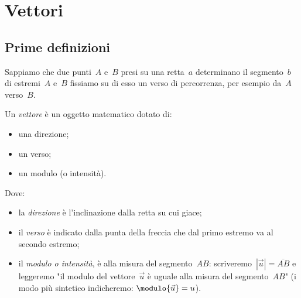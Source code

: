 


\chapter{Vettori}

\section{Prime definizioni}
\label{sec:vett_primedefinizioni}

% 

Sappiamo che due punti~$A$ e~$B$ presi su una retta~$a$ determinano il 
segmento~$b$ di estremi~$A$ e~$B$ fissiamo su di esso un verso di percorrenza, 
per esempio da~$A$ verso~$B$.

\begin{definizione}
Un \emph{vettore} è un oggetto matematico dotato di:

\begin{minipage}{.39 \textwidth}
\begin{itemize}
 \item una direzione;
 \item un verso;
 \item un modulo (o intensità).
\end{itemize}
\end{minipage}
\hfill
\begin{minipage}{.59 \textwidth}
 \begin{inaccessibleblock}
 \begin{center}
  \vettoredef
 \end{center}
\end{inaccessibleblock}
\end{minipage}
\end{definizione}

Dove:
\begin{itemize} [nosep]
\item la \emph{direzione} è l'inclinazione dalla retta su cui giace;
\item il \emph{verso} è indicato dalla punta della freccia che dal primo 
estremo va al secondo estremo;
\item il \emph{modulo o intensità}, è alla misura del segmento~$AB$: 
scriveremo~$|\vec{u}|=\overline{AB}$ e leggeremo "il modulo del 
vettore~$\vec{u}$ è uguale alla misura del segmento~$AB$"
(i modo più sintetico indicheremo: \(\modulo{\vec{u}} = u\)).
\end{itemize}

